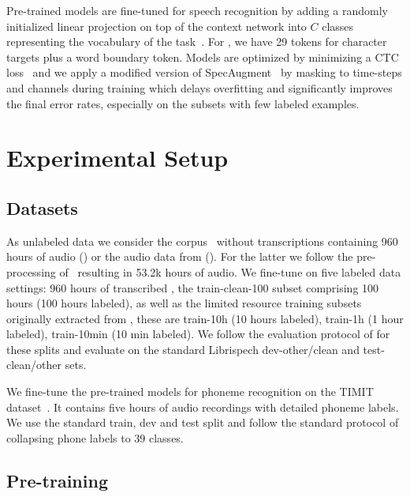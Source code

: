 \documentclass{article}
\begin{document}
Pre-trained models are fine-tuned for speech recognition by adding a randomly initialized linear projection on top of the context network into $C$ classes representing the vocabulary of the task~\citep{baevski2019effectiveness}.
For \libri{}, we have 29 tokens for character targets plus a word boundary token. 
Models are optimized by minimizing a CTC loss~\citep{graves2006ctc} and we apply a modified version of SpecAugment~\citep{park2019specaugment} by masking to time-steps and channels during training which delays overfitting and significantly improves the final error rates, especially on the \libril{} subsets with few labeled examples.


\section{Experimental Setup}
\label{sec:setup}

\subsection{Datasets}
\label{sec:setup-datasets}

As unlabeled data we consider the \libri{} corpus~\citep{panayotov2015librispeech} without transcriptions containing 960 hours of audio (\librisz{}) or the audio data from \vox{} (\voxsz{}). 
For the latter we follow the pre-processing of~\citep{kahn2020librilight} resulting in 53.2k hours of audio.
We fine-tune on five labeled data settings: 
960 hours of transcribed \libri{}, the train-clean-100 subset comprising 100 hours (100 hours labeled), as well as the \libril{} limited resource training subsets originally extracted from \libri{}, these are train-10h (10 hours labeled), train-1h (1 hour labeled), train-10min (10 min labeled). 
We follow the evaluation protocol of \libril{} for these splits and evaluate on the standard Librispech dev-other/clean and test-clean/other sets.

We fine-tune the pre-trained models for phoneme recognition on the TIMIT dataset~\citep{garofolo1993timit}. 
It contains five hours of audio recordings with detailed phoneme labels.
We use the standard train, dev and test split and follow the standard protocol of collapsing phone labels to 39 classes.

\subsection{Pre-training}
\label{sec:setup-pretrain}
\end{document}
